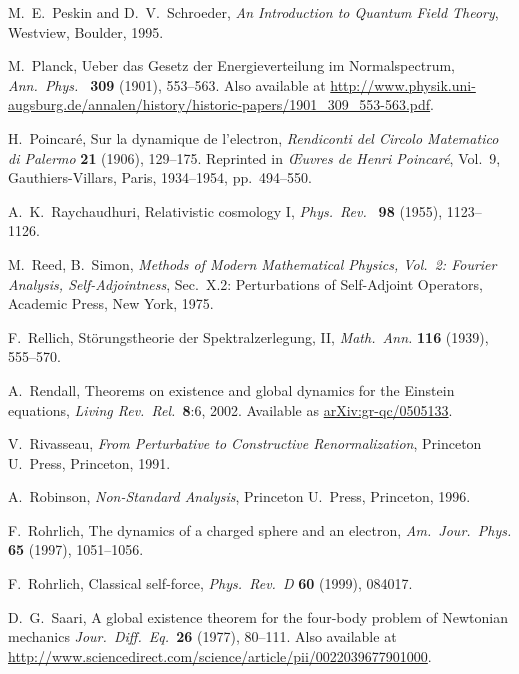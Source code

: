 \documentclass{article}
\begin{document}
\begin{thebibliography}{10}
 M.\ E.\ Peskin and D.\ V.\ Schroeder, \textsl{An Introduction
to Quantum Field Theory}, Westview, Boulder, 1995.

 M.\ Planck, Ueber das Gesetz der Energieverteilung im Normalspectrum, \textsl{Ann.\ Phys.\ } \textbf{309} (1901), 553--563.  Also available at \href{http://www.physik.uni-augsburg.de/annalen/history/historic-papers/1901_309_553-563.pdf}{http://www.physik.uni-augsburg.de/annalen/history/historic-papers/1901\_309\_553-563.pdf}.

 H.\ Poincar\'e, Sur la dynamique de l'electron, \textsl{Rendiconti del Circolo Matematico di Palermo} {\bf 21} (1906), 129--175.  Reprinted in \textsl{\OE uvres de Henri Poincar\'e}, Vol.\ 9, Gauthiers-Villars, Paris, 1934--1954, pp.\ 494--550.

 A.\ K.\ Raychaudhuri, Relativistic cosmology I, \textsl{Phys.\ Rev.\ } \textbf{98} (1955), 1123--1126.

 M.\ Reed, B.\ Simon, \textsl{Methods of Modern Mathematical Physics, Vol.\ 2: Fourier Analysis, Self-Adjointness}, Sec.\ X.2: Perturbations of Self-Adjoint Operators, Academic Press, New York, 1975.

 F.\ Rellich, St\"orungstheorie der Spektralzerlegung, II, \textit{Math.\ Ann.} {\bf 116} (1939), 555--570. 

 A.\ Rendall, Theorems on existence and global dynamics for the Einstein equations, \textsl{Living Rev.\ Rel.\ }\textbf{8}:6, 2002.  Available as \href{http://arxiv.org/abs/gr-qc/0505133}{arXiv:gr-qc/0505133}.

 V.\ Rivasseau, \textsl{From Perturbative to Constructive Renormalization}, Princeton U.\ Press, Princeton, 1991.

 A.\ Robinson, \textsl{Non-Standard Analysis}, Princeton U.\ Press, Princeton, 1996.

 F.\ Rohrlich, The dynamics of a charged sphere and an electron,
\textsl{Am.\ Jour.\ Phys.} {\bf 65} (1997), 1051--1056.

 F.\ Rohrlich, Classical self-force, \textsl{Phys.\ Rev.\ D} {\bf 60} (1999), 084017.

 D.\ G.\ Saari, A global existence theorem for the four-body problem of Newtonian mechanics  \textsl{Jour.\ Diff.\ Eq.\ }{\bf 26} (1977), 80--111.  Also available
at \href{http://www.sciencedirect.com/science/article/pii/0022039677901000}{http://www.sciencedirect.com/science/article/pii/0022039677901000}.


\end{thebibliography}
\end{document}

